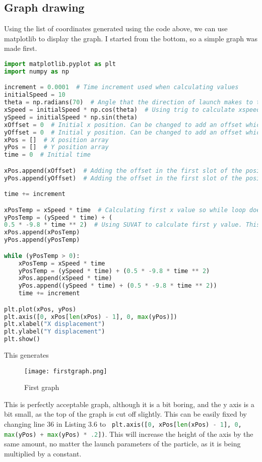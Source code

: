 \subsection{Graph drawing}
Using the list of coordinates generated using the code above, we can use matplotlib to display the graph. I started from the bottom, so a simple graph was made first. 
\begin{lstlisting}[language=Python, caption=First graph generation code]
import matplotlib.pyplot as plt
import numpy as np

increment = 0.0001  # Time increment used when calculating values
initialSpeed = 10
theta = np.radians(70)  # Angle that the direction of launch makes to the horizontal
xSpeed = initialSpeed * np.cos(theta)  # Using trig to calculate xspeed. Assumes there is no air resistance
ySpeed = initialSpeed * np.sin(theta)
xOffset = 0  # Initial x position. Can be changed to add an offset which can be in a question
yOffset = 0  # Initial y position. Can be changed to add an offset which can be in a question
xPos = []  # X position array
yPos = []  # Y position array
time = 0  # Initial time

xPos.append(xOffset)  # Adding the offset in the first slot of the position array
yPos.append(yOffset)  # Adding the offset in the first slot of the position array

time += increment

xPosTemp = xSpeed * time  # Calculating first x value so while loop doesn't fail instantly
yPosTemp = (ySpeed * time) + (
0.5 * -9.8 * time ** 2)  # Using SUVAT to calculate first y value. This is so that the while loop doesn't fail instantly
xPos.append(xPosTemp)
yPos.append(yPosTemp)

while (yPosTemp > 0):
	xPosTemp = xSpeed * time
	yPosTemp = (ySpeed * time) + (0.5 * -9.8 * time ** 2)
	xPos.append(xSpeed * time)
	yPos.append((ySpeed * time) + (0.5 * -9.8 * time ** 2))
	time += increment

plt.plot(xPos, yPos)
plt.axis([0, xPos[len(xPos) - 1], 0, max(yPos)])
plt.xlabel("X displacement")
plt.ylabel("Y displacement")
plt.show()
\end{lstlisting}
This generates
\begin{figure}[H]
	\centering
	\texttt{[image: firstgraph.png]}
	\caption{First graph}
\end{figure}
This is perfectly acceptable graph, although it is a bit boring, and the y axis is a bit small, as the top of the graph is cut off slightly. This can be easily fixed by changing line 36 in Listing 3.6 to 
\lstinline[language=Python] $ plt.axis([0, xPos[len(xPos) - 1], 0, max(yPos) + max(yPos) * .2])$. This will increase the height of the axis by the same amount, no matter the launch parameters of the particle, as it is being multiplied by a constant. 

